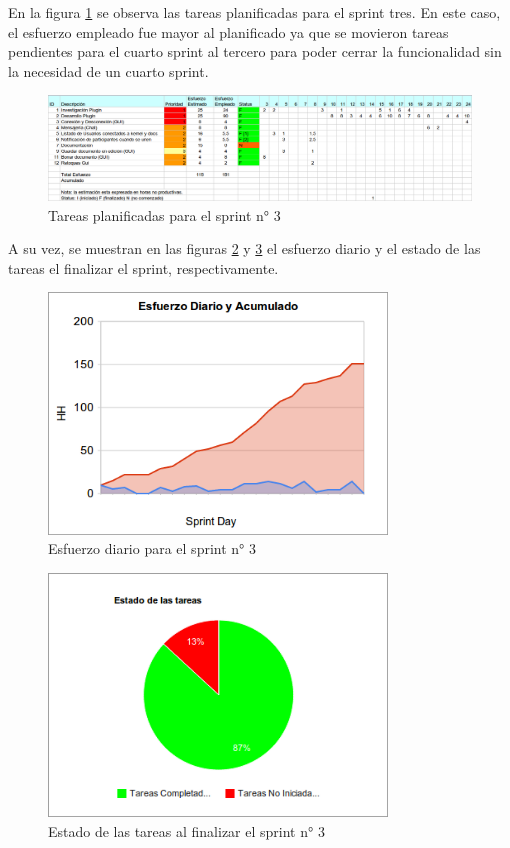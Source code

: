\documentclass[12pt,a4paper]{article}
\begin{document}
En la figura \ref{sprint3-tareas} se observa las tareas planificadas para el sprint tres. En este caso, el esfuerzo empleado
fue mayor al planificado ya que se movieron tareas pendientes para el cuarto sprint al tercero para poder cerrar la funcionalidad
sin la necesidad de un cuarto sprint.

	\begin{figure}[!ht]
		\begin{center}
			\includegraphics[width=14cm]{sprint3.png}
			\caption{\label{sprint3-tareas} Tareas planificadas para el sprint n° 3 }
		\end{center}
	\end{figure}

A su vez, se muestran en las figuras \ref{sprint3-esfuerzo} y \ref{sprint3-tareas-fin} el esfuerzo diario y el estado
de las tareas el finalizar el sprint, respectivamente.

	\begin{figure}[!ht]
		\begin{center}
			\includegraphics[width=9cm]{sprint3-esfuerzo-diario.png}
			\caption{\label{sprint3-esfuerzo} Esfuerzo diario para el sprint n° 3 }
		\end{center}
	\end{figure}

	\begin{figure}[!ht]
		\begin{center}
			\includegraphics[width=9cm]{sprint3-tareas.png}
			\caption{\label{sprint3-tareas-fin} Estado de las tareas al finalizar el sprint n° 3 }
		\end{center}
	\end{figure}
\end{document}

